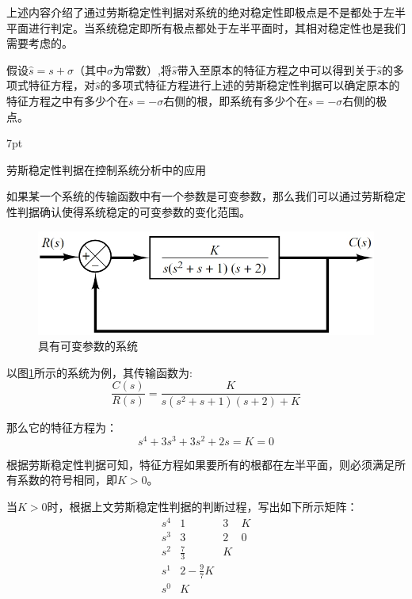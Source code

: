 \documentclass{article}
\numberwithin{equation}{section}
\numberwithin{figure}{section}
\newenvironment{formal}{%
\def\FrameCommand{%
\hspace{1pt}%
{\color{DarkBlue}\vrule width 2pt}%
{\color{formalshade}\vrule width 4pt}%
\colorbox{formalshade}%
}%
\MakeFramed{\advance\hsize-\width\FrameRestore}%
\noindent\hspace{-4.55pt}%
\begin{adjustwidth}{}{7pt}%
\vspace{2pt}\vspace{2pt}%
}
{%
\vspace{2pt}\end{adjustwidth}\endMakeFramed%
}
\begin{document}
上述内容介绍了通过劳斯稳定性判据对系统的绝对稳定性即极点是不是都处于左半平面进行判定。当系统稳定即所有极点都处于左半平面时，其相对稳定性也是我们需要考虑的。

假设$\hat{s}=s+\sigma $（其中$\sigma$为常数）,将$\hat{s}$带入至原本的特征方程之中可以得到关于$\hat{s}$的多项式特征方程，对$\hat{s}$的多项式特征方程进行上述的劳斯稳定性判据可以确定原本的特征方程之中有多少个在$s=-\sigma$右侧的根，即系统有多少个在$s=-\sigma$右侧的极点。

\begin{formal}
    劳斯稳定性判据在控制系统分析中的应用
\end{formal}

如果某一个系统的传输函数中有一个参数是可变参数，那么我们可以通过劳斯稳定性判据确认使得系统稳定的可变参数的变化范围。

\begin{figure}
    \centering
    \includegraphics[width=.6\textwidth]{Chapter5/RouthApplication.png} %
    \caption{具有可变参数的系统} %
    \label{RouthApplication} %
\end{figure}

以图\ref{RouthApplication}所示的系统为例，其传输函数为:
\begin{equation}
    \frac{C(s)}{R(s)}=\frac{K}{s(s^2+s+1)(s+2)+K}
\end{equation}

那么它的特征方程为：
\begin{equation}
    s^4+3s^3+3s^2+2s=K=0
\end{equation}

根据劳斯稳定性判据可知，特征方程如果要所有的根都在左半平面，则必须满足所有系数的符号相同，即$K>0$。

当$K>0$时，根据上文劳斯稳定性判据的判断过程，写出如下所示矩阵：
\begin{equation}
    \begin{matrix}
        s^4&1&3&K\\
        s^3&3&2&0\\
        s^2&\frac{7}{3}&K\\
        s^1&2-\frac{9}{7}K\\
        s^0&K
    \end{matrix}
\end{equation}
\end{document}
